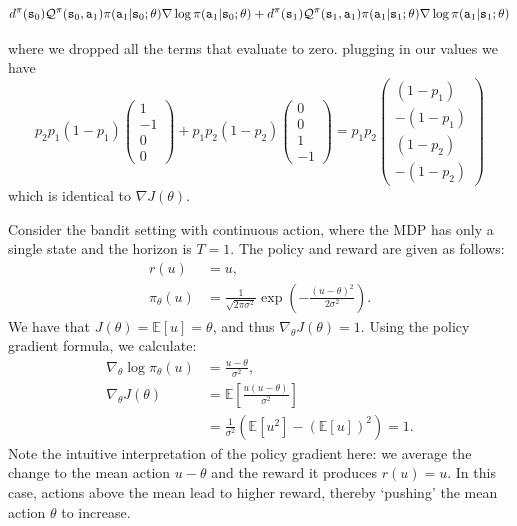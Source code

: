 \begin{example}
\[
d^{\pi}({\tt s}_0)\mathcal{Q}^\pi({\tt s}_0,{\tt a}_1)\pi({\tt a}_1|{\tt s}_0;\theta)
\nabla \log \pi({\tt a}_1|{\tt s}_0;\theta) +
d^{\pi}({\tt s}_1)\mathcal{Q}^\pi({\tt s}_1,{\tt a}_1)\pi({\tt a}_1|{\tt s}_1;\theta)
\nabla \log \pi({\tt a}_1|{\tt s}_1;\theta)
\]

where we dropped all the terms that evaluate to zero. plugging in
our values we have
\[
p_2 p_1 (1-p_1)\begin{pmatrix}1\\-1\\0\\0\end{pmatrix} + p_1 p_2
(1-p_2)\begin{pmatrix}0\\0\\1\\-1\end{pmatrix} = p_1 p_2\begin{pmatrix}(1-p_1)\\
-(1-p_1) \\  (1-p_2) \\ - (1-p_2)\end{pmatrix}
\]
which is identical to $\nabla J(\theta)$.
\end{example}

\begin{example}
    Consider the bandit setting with continuous action, where the MDP has only a single state and the horizon is $T=1$. The policy and reward are given as follows:
\begin{equation*}
    \begin{split}
        r(u) &= u, \\
        \pi_\theta(u) &= \frac{1}{\sqrt{2 \pi \sigma^2}} \exp (- \frac{(u - \theta)^2}{2 \sigma^2}).
    \end{split}
\end{equation*}
We have that $J(\theta) = \mathbb{E}[u] = \theta$, and thus $\nabla_\theta J(\theta) = 1.$
Using the policy gradient formula, we calculate:
\begin{equation*}
    \begin{split}
        \nabla_\theta \log \pi_\theta(u) &= \frac{u - \theta}{\sigma^2}, \\
        \nabla_\theta J(\theta) &= \mathbb{E} \left[\frac{u(u - \theta)}{\sigma^2}\right] \\
        &= \frac{1}{\sigma^2} (\mathbb{E} [u^2] - (\mathbb{E} [u])^2) = 1.
    \end{split}
\end{equation*}
Note the intuitive interpretation of the policy gradient here: we average the change to the mean action $u-\theta$ and the reward it produces $r(u)=u$. In this case, actions above the mean lead to higher reward, thereby `pushing' the mean action $\theta$ to increase. 
\end{example}

